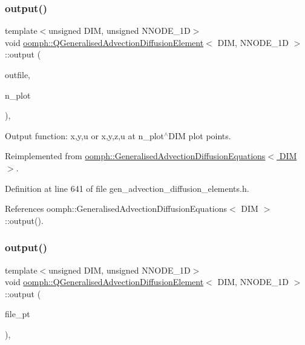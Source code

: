 \subsubsection{\texorpdfstring{output()}{output()}\hspace{0.1cm}{\footnotesize\ttfamily [2/4]}}
{\footnotesize\ttfamily template$<$unsigned D\+IM, unsigned N\+N\+O\+D\+E\+\_\+1D$>$ \\
void \hyperlink{classoomph_1_1QGeneralisedAdvectionDiffusionElement}{oomph\+::\+Q\+Generalised\+Advection\+Diffusion\+Element}$<$ D\+IM, N\+N\+O\+D\+E\+\_\+1D $>$\+::output (\begin{DoxyParamCaption}\item[{std\+::ostream \&}]{outfile,  }\item[{const unsigned \&}]{n\+\_\+plot }\end{DoxyParamCaption})\hspace{0.3cm}{\ttfamily [inline]}, {\ttfamily [virtual]}}



Output function\+: x,y,u or x,y,z,u at n\+\_\+plot$^\wedge$\+D\+IM plot points. 



Reimplemented from \hyperlink{classoomph_1_1GeneralisedAdvectionDiffusionEquations_a44995055f98a97ce229609832a03867e}{oomph\+::\+Generalised\+Advection\+Diffusion\+Equations$<$ D\+I\+M $>$}.



Definition at line 641 of file gen\+\_\+advection\+\_\+diffusion\+\_\+elements.\+h.



References oomph\+::\+Generalised\+Advection\+Diffusion\+Equations$<$ D\+I\+M $>$\+::output().

\mbox{\label{classoomph_1_1QGeneralisedAdvectionDiffusionElement_a291f773ee4bab3e9323b64c27448e89d}} 
\subsubsection{\texorpdfstring{output()}{output()}\hspace{0.1cm}{\footnotesize\ttfamily [3/4]}}
{\footnotesize\ttfamily template$<$unsigned D\+IM, unsigned N\+N\+O\+D\+E\+\_\+1D$>$ \\
void \hyperlink{classoomph_1_1QGeneralisedAdvectionDiffusionElement}{oomph\+::\+Q\+Generalised\+Advection\+Diffusion\+Element}$<$ D\+IM, N\+N\+O\+D\+E\+\_\+1D $>$\+::output (\begin{DoxyParamCaption}\item[{F\+I\+LE $\ast$}]{file\+\_\+pt }\end{DoxyParamCaption})\hspace{0.3cm}{\ttfamily [inline]}, {\ttfamily [virtual]}}



